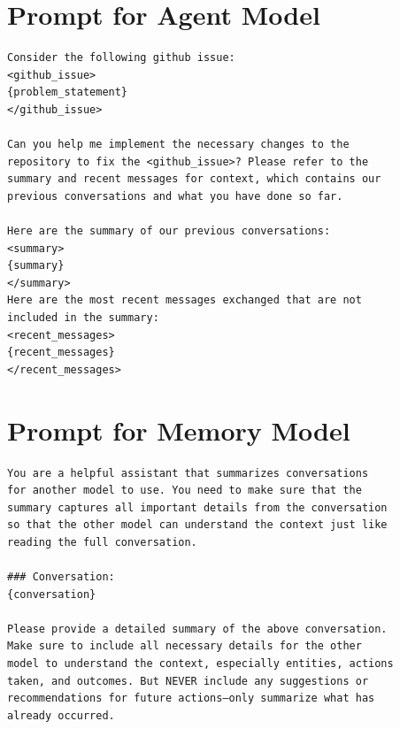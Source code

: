 \documentclass{article}
\theoremstyle{plain}
\theoremstyle{definition}
\theoremstyle{remark}
\begin{document}
\nocite{langley00}





\newpage
\appendix
\onecolumn
\section{Prompt for Agent Model}

\begin{verbatim}
Consider the following github issue:
<github_issue>
{problem_statement}
</github_issue>

Can you help me implement the necessary changes to the
repository to fix the <github_issue>? Please refer to the
summary and recent messages for context, which contains our
previous conversations and what you have done so far.

Here are the summary of our previous conversations:
<summary>
{summary}
</summary>
Here are the most recent messages exchanged that are not
included in the summary:
<recent_messages>
{recent_messages}
</recent_messages>
\end{verbatim}

\section{Prompt for Memory Model}

\begin{verbatim}
You are a helpful assistant that summarizes conversations
for another model to use. You need to make sure that the
summary captures all important details from the conversation
so that the other model can understand the context just like
reading the full conversation.

### Conversation:
{conversation}

Please provide a detailed summary of the above conversation.
Make sure to include all necessary details for the other
model to understand the context, especially entities, actions
taken, and outcomes. But NEVER include any suggestions or
recommendations for future actions—only summarize what has
already occurred.
\end{verbatim}
\end{document}
